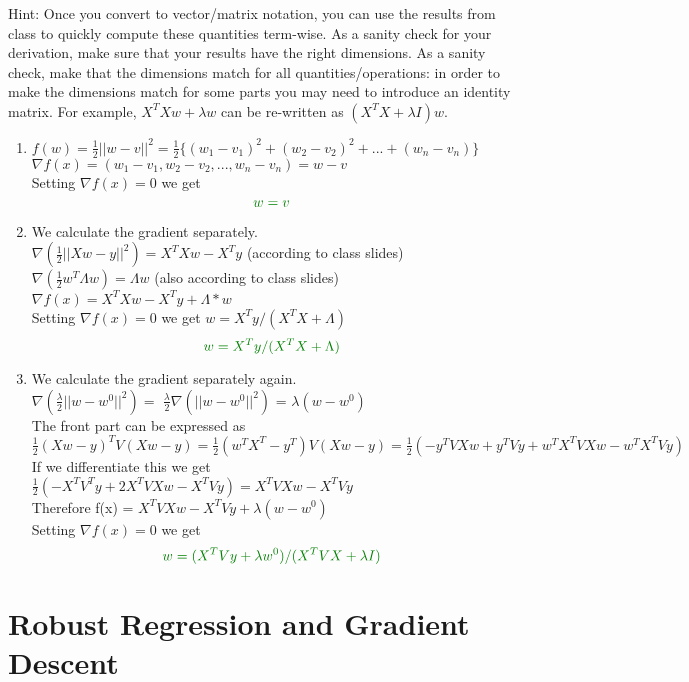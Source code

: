 \documentclass{article}
\def\gre#1{{\color{gre}#1}}
\def\red#1{{\color{red}#1}}
\def\enum#1{\begin{enumerate}#1\end{enumerate}}
\begin{document}
Hint: Once you convert to vector/matrix notation, you can use the results from class to quickly compute these quantities term-wise.
As a sanity check for your derivation, make sure that your results have the right dimensions. \red{As a sanity check, make that the dimensions match for all quantities/operations: in order to make the dimensions match for some parts you may need to introduce an identity matrix. For example, $X^TXw + \lambda w$ can be re-written as $(X^TX + \lambda I)w$.}
\red{
\enum{
\item $f(w) = \frac{1}{2}||w-v||^2 = \frac{1}{2}\{(w_1-v_1)^2+(w_2-v_2)^2+...+(w_n-v_n)\}$ \\
$\nabla f(x) = (w_1-v_1,w_2-v_2,...,w_n-v_n) = w-v$ \\
Setting $\nabla f(x) = 0$ we get
\begin{equation*}
    \gre{ w = v}
\end{equation*}
\item We calculate the gradient separately.
\\ $\nabla(\frac{1}{2}||Xw-y||^2)=X^TXw-X^Ty$ (according to class slides)
\\ $\nabla(\frac{1}{2}w^T\Lambda w) = \Lambda w$ (also according to class slides)
\\$\nabla f(x) = X^TXw-X^Ty+\Lambda*w$ \\
Setting $\nabla f(x) = 0$ we get $w = X^Ty/(X^TX+\Lambda)$
\begin{equation*}
    \gre{w = X^Ty/(X^TX+\Lambda)}
\end{equation*}
\item We calculate the gradient separately again.\\
$\nabla(\frac{\lambda}{2}||w-w^0||^2) = $ $\frac{\lambda}{2}\nabla(||w-w^0||^2)$ = $\lambda(w-w^0)$\\
The front part can be expressed as\\
$\frac{1}{2}(Xw-y)^TV(Xw-y)=\frac{1}{2}(w^TX^T-y^T)V(Xw-y)=\frac{1}{2}(-y^TVXw+y^TVy+w^TX^TVXw-w^TX^TVy)$\\
If we differentiate this we get\\
$\frac{1}{2}(-X^TV^Ty+2X^TVXw-X^TVy) = X^TVXw-X^TVy$ \\
Therefore \nabla f(x) = $X^TVXw-X^TVy + \lambda(w-w^0)$ \\
Setting $\nabla f(x) = 0$ we get
\begin{equation*}
    \gre{ w = (X^TVy+\lambda w^0)/(X^TVX+\lambda I)}
\end{equation*}
}}


\section{Robust Regression and Gradient Descent}
\end{document}
